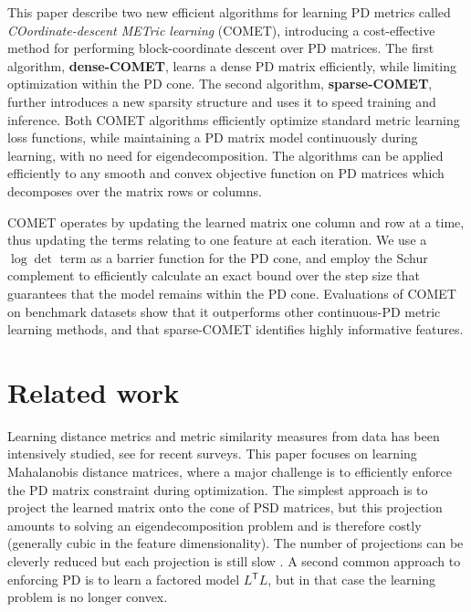 \documentclass[twoside,11pt]{article}
\newcommand\mat[1]{{#1}}
\newcommand{\T}{{}^\mathsf{T}}
\newcommand{\cholL}{\mat{L}}
\begin{document}
This paper describe two new efficient algorithms for learning PD metrics called {\em{COordinate-descent METric learning}} (COMET), introducing a cost-effective method for performing block-coordinate descent over PD  matrices. The first algorithm, {\bf dense-COMET}, learns a dense PD matrix efficiently, while limiting optimization within the PD cone. The second algorithm, {\bf sparse-COMET}, further introduces a new sparsity structure and uses it to speed training and inference. Both COMET algorithms efficiently optimize standard metric learning loss functions, while maintaining a PD matrix model continuously during learning, with no need for eigendecomposition. The algorithms can be applied efficiently to any smooth and convex objective function on PD matrices which decomposes over the matrix rows or columns.

COMET operates by updating the learned matrix one column and row at a time, thus updating the terms relating to one feature at each iteration. We use a $\log \det$ term as a barrier function for the PD cone, and employ the Schur complement to efficiently calculate an exact bound over the step size that guarantees that the model remains within the PD cone. Evaluations of COMET on benchmark datasets show that it outperforms other continuous-PD metric learning methods, and that sparse-COMET identifies highly informative features. 
\vspace{-6pt}
\section{Related work}
\vskip -5pt
Learning distance metrics and metric similarity measures from data has been intensively studied, see \citet{bellet2013survey, kulis2012survey} for recent surveys. This paper focuses on learning Mahalanobis distance matrices, where a major challenge  is to efficiently enforce the PD matrix constraint during optimization. The simplest approach is to project the learned matrix onto the cone of PSD matrices, but this projection amounts to solving an eigendecomposition problem and is therefore costly (generally cubic in the feature dimensionality). The number of projections can be cleverly reduced but each projection is still slow \citep{qianHD, qian}. A second common approach to enforcing PD is to learn a factored model $\cholL\T \cholL$, but in that case the learning problem is no longer convex. 
\end{document}
